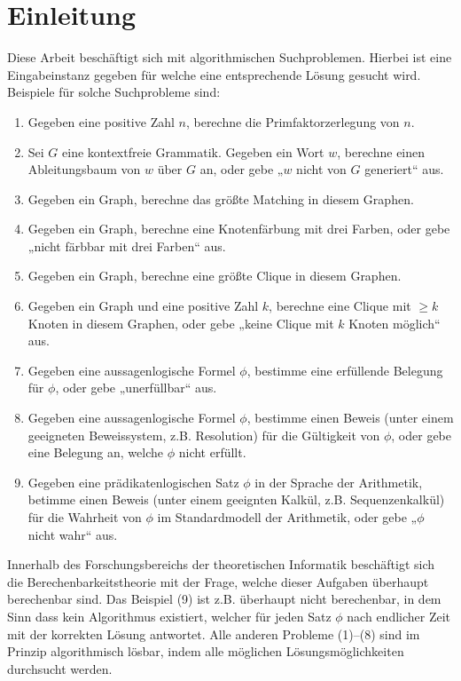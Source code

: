 \chapter{Einleitung}

Diese Arbeit beschäftigt sich mit algorithmischen Suchproblemen. 
Hierbei ist eine Eingabeinstanz gegeben für welche eine entsprechende Lösung gesucht wird.
Beispiele für solche Suchprobleme sind:
\begin{enumerate}[label=\arabic*.]
    \item Gegeben eine positive Zahl $n$, berechne die Primfaktorzerlegung von $n$.
    \item Sei $G$ eine kontextfreie Grammatik. Gegeben ein Wort $w$, berechne einen Ableitungsbaum von $w$ über $G$ an, oder gebe „$w$ nicht von $G$ generiert“ aus.
    \item Gegeben ein Graph, berechne das größte Matching in diesem Graphen.
    \item Gegeben ein Graph, berechne eine Knotenfärbung mit drei Farben, oder gebe „nicht färbbar mit drei Farben“ aus.
    \item Gegeben ein Graph, berechne eine größte Clique in diesem Graphen.
    \item Gegeben ein Graph und eine positive Zahl $k$, berechne eine Clique mit $\geq k$ Knoten in diesem Graphen, oder gebe „keine Clique mit $k$ Knoten möglich“ aus.
    \item Gegeben eine aussagenlogische Formel $\phi$, bestimme eine erfüllende Belegung für $\phi$, oder gebe „unerfüllbar“ aus.
    \item Gegeben eine aussagenlogische Formel $\phi$, bestimme einen Beweis (unter einem geeigneten Beweissystem, z.B. Resolution) für die Gültigkeit von $\phi$, oder gebe eine Belegung an, welche $\phi$ nicht erfüllt.
    \item Gegeben eine prädikatenlogischen Satz $\phi$ in der Sprache der Arithmetik, betimme einen Beweis (unter einem geeignten Kalkül, z.B. Sequenzenkalkül) für die Wahrheit von $\phi$ im Standardmodell der Arithmetik, oder gebe „$\phi$ nicht wahr“ aus.
\end{enumerate}
Innerhalb des Forschungsbereichs der theoretischen Informatik beschäftigt sich die Berechenbarkeitstheorie mit der Frage, welche dieser Aufgaben überhaupt berechenbar sind. Das Beispiel (9) ist z.B. überhaupt nicht berechenbar, in dem Sinn dass kein Algorithmus existiert, welcher für jeden Satz $\phi$ nach endlicher Zeit mit der korrekten Lösung antwortet.
Alle anderen Probleme (1)--(8) sind im Prinzip algorithmisch lösbar, indem alle möglichen Lösungsmöglichkeiten durchsucht werden.

